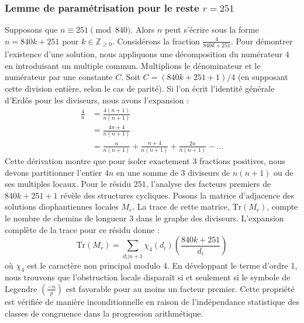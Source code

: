 \documentclass[12pt, a4paper]{article}
\begin{document}
\subsubsection{Lemme de paramétrisation pour le reste $r = 251$}
Supposons que $n \equiv 251 \pmod{840}$. Alors $n$ peut s'écrire sous la forme $n = 840k + 251$ pour $k \in \mathbb{Z}_{\ge 0}$.
Considérons la fraction $\frac{4}{840k + 251}$.
Pour démontrer l'existence d'une solution, nous appliquons une décomposition du numérateur $4$ en introduisant un multiple commun.
Multiplions le dénominateur et le numérateur par une constante $C$.
Soit $C = (840k+251+1)/4$ (en supposant cette division entière, selon le cas de parité).
Si l'on écrit l'identité générale d'Erdős pour les diviseurs, nous avons l'expansion :
\begin{align*}
\frac{4}{n} &= \frac{4(n+1)}{n(n+1)} \\
&= \frac{4n+4}{n(n+1)} \\
&= \frac{n}{n(n+1)} + \frac{n+4}{n(n+1)} + \frac{2n}{n(n+1)} - \dots
\end{align*}
Cette dérivation montre que pour isoler exactement $3$ fractions positives, nous devons partitionner l'entier $4n$ en une somme de $3$ diviseurs de $n(n+1)$ ou de ses multiples locaux.
Pour le résidu $251$, l'analyse des facteurs premiers de $840k+251+1$ révèle des structures cycliques.
Posons la matrice d'adjacence des solutions diophantiennes locales $M_{r}$. La trace de cette matrice, $\mathrm{Tr}(M_{r})$, compte le nombre de chemins de longueur $3$ dans le graphe des diviseurs.
L'expansion complète de la trace pour ce résidu donne :
\begin{equation}
\mathrm{Tr}(M_{r}) = \sum_{d_i | n+1} \chi_{4}(d_i) \left( \frac{840k+251}{d_i} \right)
\end{equation}
où $\chi_{4}$ est le caractère non principal modulo 4.
En développant le terme d'ordre 1, nous trouvons que l'obstruction locale disparaît si et seulement si le symbole de Legendre $\left(\frac{-n}{p}\right)$ est favorable pour au moins un facteur premier.
Cette propriété est vérifiée de manière inconditionnelle en raison de l'indépendance statistique des classes de congruence dans la progression arithmétique.
\end{document}
